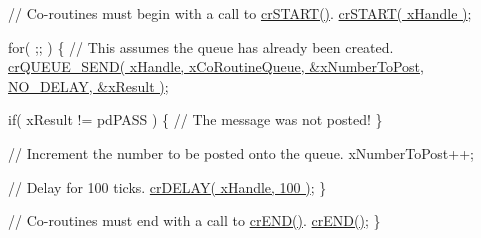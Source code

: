 \begin{DoxyPre}   // Co-routines must begin with a call to \hyperlink{vendor_2ceedling_2plugins_2freertos_2src_2freertos_2include_2croutine_8h_a19a57a201a325e8af1207ed68c4aedde}{crSTART()}.
   \hyperlink{vendor_2ceedling_2plugins_2freertos_2src_2freertos_2include_2croutine_8h_a19a57a201a325e8af1207ed68c4aedde}{crSTART( xHandle )};\end{DoxyPre}



\begin{DoxyPre}   for( ;; )
   \{
       // This assumes the queue has already been created.
       \hyperlink{vendor_2ceedling_2plugins_2freertos_2src_2freertos_2include_2croutine_8h_a26af3d36f22a04168eebdf5b08465d6e}{crQUEUE\_SEND( xHandle, xCoRoutineQueue, &xNumberToPost, NO\_DELAY, &xResult )};\end{DoxyPre}



\begin{DoxyPre}       if( xResult != pdPASS )
       \{
           // The message was not posted!
       \}\end{DoxyPre}



\begin{DoxyPre}       // Increment the number to be posted onto the queue.
       xNumberToPost++;\end{DoxyPre}



\begin{DoxyPre}       // Delay for 100 ticks.
       \hyperlink{vendor_2ceedling_2plugins_2freertos_2src_2freertos_2include_2croutine_8h_a05a06feb11028f2d1d440ea335f562ba}{crDELAY( xHandle, 100 )};
   \}\end{DoxyPre}



\begin{DoxyPre}   // Co-routines must end with a call to \hyperlink{vendor_2ceedling_2plugins_2freertos_2src_2freertos_2include_2croutine_8h_ae6038cc976689b50000475ebfc4e2f23}{crEND()}.
   \hyperlink{vendor_2ceedling_2plugins_2freertos_2src_2freertos_2include_2croutine_8h_ae6038cc976689b50000475ebfc4e2f23}{crEND()};
\}\end{DoxyPre}
 